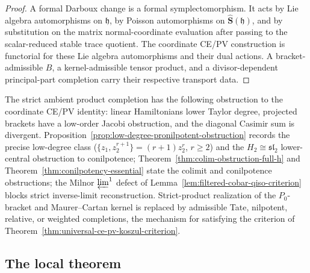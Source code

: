 \documentclass[11pt]{memoir}
\begin{document}
\begin{proof}
  A formal Darboux change is a formal symplectomorphism. It acts by Lie
  algebra automorphisms on \(\mathfrak h\), by Poisson automorphisms on
  \(\widehat{\mathbf S}(\mathfrak h)\), and by substitution on the matrix
  normal-coordinate evaluation after passing to the scalar-reduced stable
  trace quotient. The coordinate CE/PV construction is functorial for
  these Lie algebra automorphisms and their dual actions.  A
  bracket-admissible \(B\), a kernel-admissible tensor product, and a
  divisor-dependent principal-part completion carry their respective
  transport data.
\end{proof}

\begin{rmk}
  The strict ambient product completion has the following obstruction to
  the coordinate CE/PV identity: linear Hamiltonians lower Taylor degree, projected
  brackets have a low-order Jacobi obstruction, and the diagonal Casimir sum is
  divergent.  Proposition~\ref{prop:low-degree-pronilpotent-obstruction}
  records the precise low-degree class
  (\(\{z_1,z_2^{r+1}\}=(r+1)z_2^r\), \(r\geq2\)) and the
  \(H_2\cong\mathfrak{sl}_2\) lower-central obstruction to conilpotence;
  Theorem~\ref{thm:colim-obstruction-full-h} and
  Theorem~\ref{thm:conilpotency-essential} state the colimit and
  conilpotence obstructions; the Milnor \(\varprojlim^1\) defect of
  Lemma~\ref{lem:filtered-cobar-qiso-criterion} blocks strict
  inverse-limit reconstruction.  Strict-product realization of the
  \(P_0\)-bracket and Maurer--Cartan kernel is replaced by admissible
  Tate, nilpotent, relative, or weighted completions, the mechanism
  for satisfying the criterion of
  Theorem~\ref{thm:universal-ce-pv-koszul-criterion}.
\end{rmk}

\subsection{The local theorem}\label{ssec:local-theorem}
\end{document}
